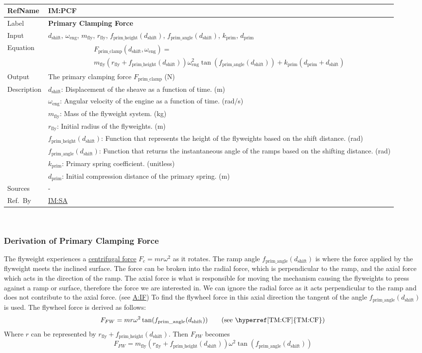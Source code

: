 \documentclass[12pt]{article}
\newcommand{\colAwidth}{0.13\textwidth}
\newcommand{\colBwidth}{0.82\textwidth}
\newcommand{\hpref}[1]{\hyperref[#1]{#1}}
\newcommand{\definstance}[8] {
~\newline
\noindent
\begin{minipage}{\textwidth}
\renewcommand*{\arraystretch}{1.5}
\begin{tabular}{| p{\colAwidth} | p{\colBwidth}|}
  \hline
  \rowcolor[gray]{0.9}
  RefName& \textbf{#1} \label{#1}\\
  \hline
  Label& \bf #2 \\
  \hline
  Input& #3\\
  \hline
  Equation& #4\\
  \hline
  Output& #5\\
  \hline
  Description& #6 \\
  \hline
  Sources& #7 \\
  \hline
  Ref.\ By & #8\\
  \hline
\end{tabular}
\end{minipage}\\
}
\begin{document}
\definstance
{IM:PCF}
{Primary Clamping Force}
{$d_{\text{shift}}$, $\omega_\text{eng}$, $m_\text{fly}$, $r_{\text{fly}}$, $f_{\text{prim\_height}}(d_{\text{shift}})$, $f_{\text{prim\_angle}}(d_{\text{shift}})$, $k_{\text{prim}}$, $d_{\text{prim}}$} %
{
  \begin{multline*}
  F_{\text{prim\_clamp}}(d_\text{shift}, \omega_\text{eng}) = \\
  m_\text{fly} (r_{\text{fly}} + f_{\text{prim\_height}}(d_\text{shift}))
  \omega_\text{eng}^2 \tan(f_{\text{prim\_angle}}(d_\text{shift}))
  + k_{\text{prim}} (d_{\text{prim}} + d_\text{shift})
  \end{multline*}
  }
{The primary clamping force $F_{\text{prim\_clamp}}$ (N)}
{
  $d_\text{shift}$: Displacement of the sheave as a function of time. (m)\\
  &$\omega_\text{eng}$: Angular velocity of the engine as a function of time. (rad/s)\\
  &$m_\text{fly}$: Mass of the flyweight system. (kg) \\ 
  &$r_{\text{fly}}$: Initial radius of the flyweights. (m) \\ 
  &$f_{\text{prim\_height}}(d_{\text{shift}})$: Function that represents the height of the flyweights based on the shift distance. (rad) \\
  &$f_{\text{prim\_angle}}(d_{\text{shift}})$: Function that returns the instantaneous angle of the ramps based on the shifting distance. (rad) \\ 
  &$k_{\text{prim}}$: Primary spring coefficient. (unitless) \\ 
  &$d_{\text{prim}}$: Initial compression distance of the primary spring. (m)
} %
{-} %
{\hpref{IM:SA}}

\subsubsection*{Derivation of Primary Clamping Force}

The flyweight experiences a \hyperref[TM:CF]{centrifugal force} {$F_c = m r\omega^2 $} as it rotates. 
The ramp angle $f_{\text{prim\_angle}}(d_{\text{shift}})$ is where the force applied by the flyweight meets the inclined surface.
The force can be broken into the radial force, which is perpendicular to the ramp, and the axial force which acts in the direction of the ramp.
The axial force is what is responsible for moving the mechanism causing the flyweights to press against a ramp or surface, therefore the force we are interested in.
We can ignore the radial force as it acts perpendicular to the ramp and does not contribute to the axial force. (see \hpref{A:IF})
To find the flywheel force in this axial direction the tangent of the angle $f_{\text{prim\_angle}}(d_{\text{shift}})$ is used.
The flywheel force is derived as follows: 
\[
F_{FW} = m r \omega^2 \tan(f_{\text{prim\_angle}}(d_{\text{shift}})) \tag*{\text{(see \hyperref[TM:CF]{TM:CF})}}
\]
Where \( r \) can be represented by \( r_{\text{fly}} + f_{\text{prim\_height}}(d_{\text{shift}}) \). Then \( F_{FW} \) becomes 
\[
F_{FW} = m_\text{fly} (r_{\text{fly}} + f_{\text{prim\_height}}(d_{\text{shift}}))\omega^2 \tan(f_{\text{prim\_angle}}(d_{\text{shift}}))
\]
\end{document}
